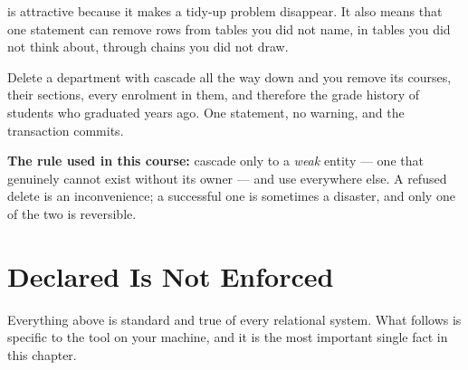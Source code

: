 \begin{alertbox}
 is attractive because it makes a tidy-up problem
disappear. It also means that one  statement can remove rows
from tables you did not name, in tables you did not think about, through
chains you did not draw.

\smallskip
Delete a department with cascade all the way down and you remove its courses,
their sections, every enrolment in them, and therefore the grade history of
students who graduated years ago. One statement, no warning, and the
transaction commits.

\smallskip
\textbf{The rule used in this course:} cascade only to a \emph{weak} entity ---
one that genuinely cannot exist without its owner --- and use 
everywhere else. A refused delete is an inconvenience; a successful one is
sometimes a disaster, and only one of the two is reversible.
\end{alertbox}

\section{Declared Is Not Enforced}

Everything above is standard and true of every relational system. What follows
is specific to the tool on your machine, and it is the most important single
fact in this chapter.

